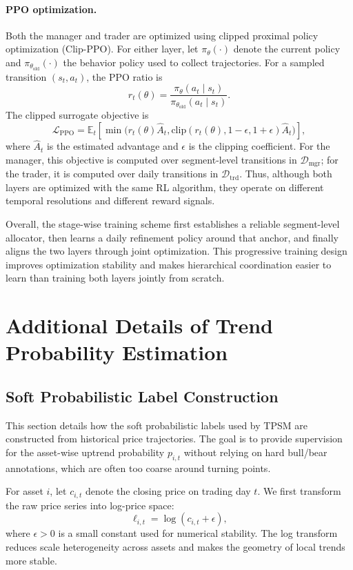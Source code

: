\documentclass[letterpaper]{article} %
\begin{document}
\paragraph{PPO optimization.}
Both the manager and trader are optimized using clipped proximal policy optimization (Clip-PPO). For either layer, let \(\pi_{\theta}(\cdot)\) denote the current policy and \(\pi_{\theta_{\mathrm{old}}}(\cdot)\) the behavior policy used to collect trajectories. For a sampled transition \((s_t,a_t)\), the PPO ratio is
\[
r_t(\theta)
=
\frac{\pi_{\theta}(a_t\mid s_t)}
{\pi_{\theta_{\mathrm{old}}}(a_t\mid s_t)}.
\]
The clipped surrogate objective is
\[
\mathcal{L}_{\mathrm{PPO}}
=
\mathbb{E}_t\!\left[
\min\!\bigl(
r_t(\theta)\hat{A}_t,
\mathrm{clip}(r_t(\theta),1-\epsilon,1+\epsilon)\hat{A}_t
\bigr)
\right],
\]
where \(\hat{A}_t\) is the estimated advantage and \(\epsilon\) is the clipping coefficient. For the manager, this objective is computed over segment-level transitions in \(\mathcal{D}_{\mathrm{mgr}}\); for the trader, it is computed over daily transitions in \(\mathcal{D}_{\mathrm{trd}}\). Thus, although both layers are optimized with the same RL algorithm, they operate on different temporal resolutions and different reward signals.

Overall, the stage-wise training scheme first establishes a reliable segment-level allocator, then learns a daily refinement policy around that anchor, and finally aligns the two layers through joint optimization. This progressive training design improves optimization stability and makes hierarchical coordination easier to learn than training both layers jointly from scratch. 
\section{Additional Details of Trend Probability Estimation}
\label{app:tpsm_all}

\subsection{Soft Probabilistic Label Construction}
\label{app:soft_label}

This section details how the soft probabilistic labels used by TPSM are constructed from historical price trajectories. The goal is to provide supervision for the asset-wise uptrend probability \(p_{i,t}\) without relying on hard bull/bear annotations, which are often too coarse around turning points.

For asset \(i\), let \(c_{i,t}\) denote the closing price on trading day \(t\). We first transform the raw price series into log-price space:
\[
\ell_{i,t}=\log(c_{i,t}+\epsilon),
\]
where \(\epsilon>0\) is a small constant used for numerical stability. The log transform reduces scale heterogeneity across assets and makes the geometry of local trends more stable.
\end{document}
